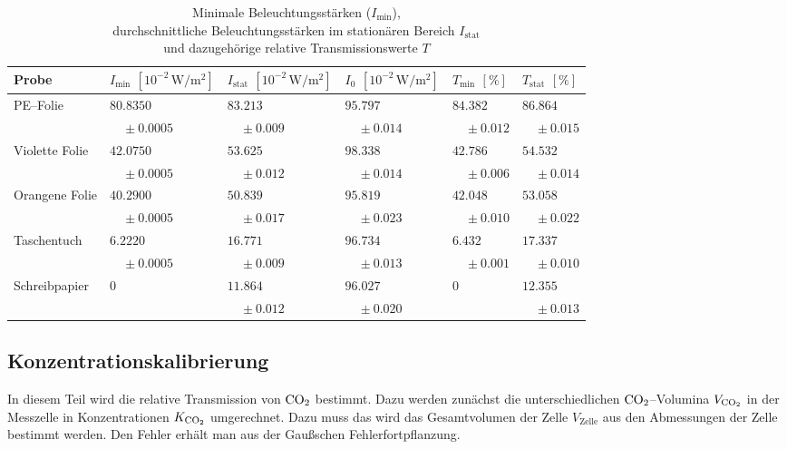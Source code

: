\documentclass[12pt,a4paper]{scrartcl}
\numberwithin{equation}{section} %
\begin{document}
\begin{table}[h!]
	\centering
	\begin{tabular}{l|p{2.1cm}|p{2.1cm}|p{2.1cm}|p{1.8cm}|p{1.8cm}}
		Probe
			& $I_\mathrm{min}$ $[10^{-2} \mathrm{\, W/m^2}]$
			& $I_\mathrm{stat}$ $[10^{-2} \mathrm{\, W/m^2}]$
			& $I_0$ $[10^{-2} \mathrm{\, W/m^2}]$
			& $T_\mathrm{min}$ $[\%]$
			& $T_\mathrm{stat}$ $[\%]$ \\
		\hline
		PE--Folie
			& $80.8350$
			& $83.213$
			& $95.797$
			& $84.382$
			& $86.864$ \\
			& $\quad\pm 0.0005$
			& $\quad\pm 0.009$
			& $\quad\pm 0.014$
			& $\quad\pm 0.012$
			& $\quad\pm 0.015$ \\
		Violette Folie
			& $42.0750$
			& $53.625$
			& $98.338$
			& $42.786$
			& $54.532$ \\
			& $\quad\pm 0.0005$
			& $\quad\pm 0.012$
			& $\quad\pm 0.014$
			& $\quad\pm 0.006$
			& $\quad\pm 0.014$ \\
		Orangene Folie
			 & $40.2900$
			 & $50.839$
			 & $95.819$
			 & $42.048$
			 & $53.058$ \\
			 & $\quad\pm 0.0005$
             & $\quad\pm 0.017$
			 & $\quad\pm 0.023$
			 & $\quad\pm 0.010$
			 & $\quad\pm 0.022$ \\
		Taschentuch
			 & $6.2220$
			 & $16.771$
			 & $96.734$
			 & $6.432$
			 & $17.337$ \\
			 & $\quad\pm 0.0005$
			 & $\quad\pm 0.009$
			 & $\quad\pm 0.013$
			 & $\quad\pm 0.001$
			 & $\quad\pm 0.010$ \\
		Schreibpapier
			 & $0$
			 & $11.864$
			 & $96.027$
			 & $0$
			 & $12.355$ \\
			 &&$\quad\pm 0.012$
			 & $\quad\pm 0.020$
			 && $\quad\pm 0.013$ \\
	\end{tabular}
	\caption{Minimale Beleuchtungsstärken ($I_\mathrm{min}$),\\
		durchschnittliche Beleuchtungsstärken im stationären Bereich $I_\mathrm{stat}$\\
		und dazugehörige relative Transmissionswerte $T$}
	\label{table:materialien}
\end{table}

\subsection{Konzentrationskalibrierung}
\label{Konzentrationskalibrierung}

In diesem Teil wird die relative Transmission von $\ce{CO_2}$ bestimmt. Dazu werden zunächst die unterschiedlichen $\ce{CO_2}$--Volumina $V_{\ce{CO_2}}$ in der Messzelle in Konzentrationen $K_{\ce{CO_2}}$ umgerechnet. Dazu muss das wird das Gesamtvolumen der Zelle $V_\mathrm{Zelle}$ aus den Abmessungen der Zelle bestimmt werden. Den Fehler erhält man aus der Gaußschen Fehlerfortpflanzung.
\end{document}
